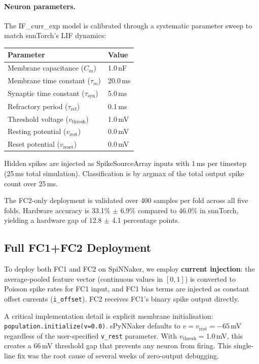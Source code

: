 \paragraph{Neuron parameters.}
The IF\_curr\_exp model is calibrated through a systematic parameter sweep to match snnTorch's LIF dynamics:

\begin{center}
\small
\begin{tabular}{@{}ll@{}}
\toprule
\textbf{Parameter} & \textbf{Value} \\
\midrule
Membrane capacitance ($C_m$) & 1.0\,nF \\
Membrane time constant ($\tau_m$) & 20.0\,ms \\
Synaptic time constant ($\tau_{\text{syn}}$) & 5.0\,ms \\
Refractory period ($\tau_{\text{ref}}$) & 0.1\,ms \\
Threshold voltage ($v_{\text{thresh}}$) & 1.0\,mV \\
Resting potential ($v_{\text{rest}}$) & 0.0\,mV \\
Reset potential ($v_{\text{reset}}$) & 0.0\,mV \\
\bottomrule
\end{tabular}
\end{center}

Hidden spikes are injected as SpikeSourceArray inputs with 1\,ms per timestep (25\,ms total simulation). Classification is by argmax of the total output spike count over 25\,ms.

The FC2-only deployment is validated over 400 samples per fold across all five folds. Hardware accuracy is 33.1\% $\pm$ 6.9\% compared to 46.0\% in snnTorch, yielding a hardware gap of 12.8 $\pm$ 4.1 percentage points.

\subsection{Full FC1+FC2 Deployment}
\label{ssec:full-deploy}

To deploy both FC1 and FC2 on SpiNNaker, we employ \textbf{current injection}: the average-pooled feature vector (continuous values in $[0, 1]$) is converted to Poisson spike rates for FC1 input, and FC1 bias terms are injected as constant offset currents (\texttt{i\_offset}). FC2 receives FC1's binary spike output directly.

A critical implementation detail is explicit membrane initialisation: \texttt{population.initialize(v=0.0)}. sPyNNaker defaults to $v = v_{\text{rest}} = -65$\,mV regardless of the user-specified \texttt{v\_rest} parameter. With $v_{\text{thresh}} = 1.0$\,mV, this creates a 66\,mV threshold gap that prevents any neuron from firing. This single-line fix was the root cause of several weeks of zero-output debugging.

